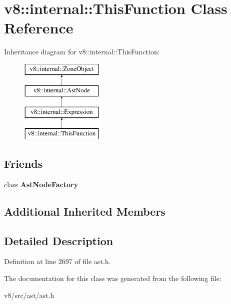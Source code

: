 \hypertarget{classv8_1_1internal_1_1ThisFunction}{}\section{v8\+:\+:internal\+:\+:This\+Function Class Reference}
\label{classv8_1_1internal_1_1ThisFunction}
Inheritance diagram for v8\+:\+:internal\+:\+:This\+Function\+:\begin{figure}[H]
\begin{center}
\leavevmode
\includegraphics[height=4.000000cm]{classv8_1_1internal_1_1ThisFunction}
\end{center}
\end{figure}
\subsection*{Friends}
\begin{DoxyCompactItemize}
\item 
\mbox{\label{classv8_1_1internal_1_1ThisFunction_a8d587c8ad3515ff6433eb83c578e795f}} 
class {\bfseries Ast\+Node\+Factory}
\end{DoxyCompactItemize}
\subsection*{Additional Inherited Members}


\subsection{Detailed Description}


Definition at line 2697 of file ast.\+h.



The documentation for this class was generated from the following file\+:\begin{DoxyCompactItemize}
\item 
v8/src/ast/ast.\+h\end{DoxyCompactItemize}
